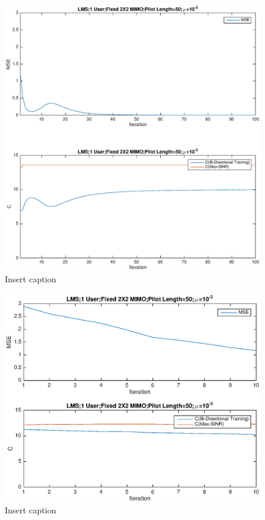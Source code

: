 \documentclass[11pt, oneside]{article}   	%
\begin{document}
\begin{figure}[bp!]
    \centering
    \centerline{\includegraphics[width=220mm]{LMS4}}
    \caption{Insert caption}
\end{figure} 

\begin{figure}[bp!]
    \centering
    \centerline{\includegraphics[width=220mm]{LMS5}}
    \caption{Insert caption}
\end{figure} 
\end{document}
